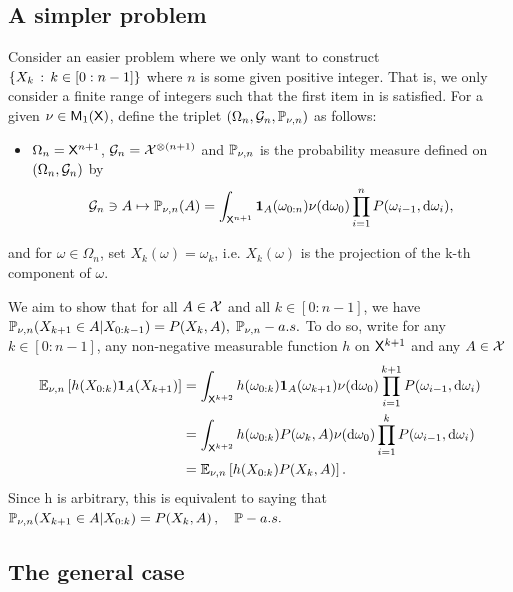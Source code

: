 \documentclass[english,graybox,envcountchap,envcountsame,sectrefs,shortlabels]{svmono}
\theoremstyle{style}
\begin{document}
\subsection{A simpler problem }

Consider an easier problem where we only want to construct $\left\{ X_{k}\,:\,k\in[0:n-1]\right\}$
where $n$ is some given positive integer. That is, we only consider
a finite range of integers such that the first item in 
is satisfied. For a given $\nu\in\mathsf{M}_{1}(\mathsf{X})$, define the triplet
$(\Omega_{n},\mathcal{G}_{n},\mathbb{P}_{\nu,n})$ as follows:
\begin{itemize}
\item $\Omega_{n}=\mathsf{X}^{n+1}$, $\mathcal{G}_{n}=\mathcal{X}^{\otimes(n+1)}$ and
$\mathbb{P}_{\nu,n}$ is the probability measure defined on $(\Omega_{n},\mathcal{G}_{n})$
by
\[
\mathcal{G}_{n}\ni A\mapsto\mathbb{P}_{\nu,n}(A)=\int_{\mathsf{X}^{n+1}}\mathbf{1}_{A}(\omega_{0:n})\nu(\mathrm{d}\omega_{0})\prod_{i=1}^{n}P(\omega_{i-1},\mathrm{d}\omega_{i}),
\]
\end{itemize}
and for $\omega\in\Omega_{n}$, set $X_{k}(\omega)=\omega_{k}$, i.e.
$X_{k}(\omega)$ is the projection of the k-th component of $\omega$.

We aim to show that for all $A\in\mathcal{X}$ and all $k\in[0:n-1]$,
we have $\mathbb{P}_{\nu,n}(X_{k+1}\in A|X_{0:k-1})=P(X_{k},A),\;\mathbb{P}_{\nu,n}-a.s.$
To do so, write for any $k\in[0:n-1]$, any non-negative measurable
function $h$ on $\mathsf{X}^{k+1}$ and any $A\in\mathcal{X}$
\begin{align*}
\mathbb{E}_{\nu,n}\left[h(X_{0:k})\mathbf{1}_{A}(X_{k+1})\right] & =\int_{\mathsf{X}^{k+2}}h(\omega_{0:k})\mathbf{1}_{A}(\omega_{k+1})\nu(\mathrm{d}\omega_{0})\prod_{i=1}^{k+1}P(\omega_{i-1},\mathrm{d}\omega_{i})\\
 & =\int_{\mathsf{X}^{k+2}}h(\omega_{0:k})P(\omega_{k},A)\nu(\mathrm{d}\omega_{0})\prod_{i=1}^{k}P(\omega_{i-1},\mathrm{d}\omega_{i})\\
 & =\mathbb{E}_{\nu,n}\left[h(X_{0:k})P(X_{k},A)\right].
\end{align*}
Since h is arbitrary, this is equivalent to saying that $\mathbb{P}_{\nu,n}(X_{k+1}\in A|X_{0:k})=P(X_{k},A)\,,\quad\mathbb{P}-a.s.$

\subsection{The general case }
\end{document}
